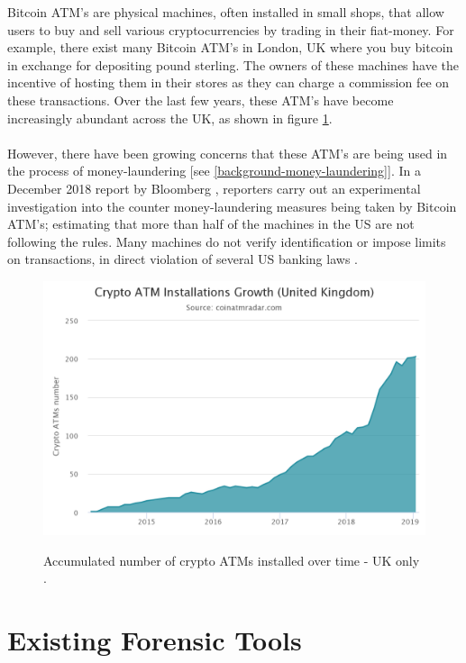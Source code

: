 Bitcoin ATM's are physical machines, often installed in small shops, that allow users to buy and sell various cryptocurrencies by trading in their \gls{fiat-money}. For example, there exist many Bitcoin ATM's in London, UK where you buy bitcoin in exchange for depositing pound sterling. The owners of these machines have the incentive of hosting them in their stores as they can charge a commission fee on these transactions. Over the last few years, these ATM's have become increasingly abundant across the UK, as shown in figure \ref{fig:background-atm-growth}. 
\\\\
However, there have been growing concerns that these ATM's are being used in the process of \gls{money-laundering} [see \ref{background-money-laundering}]. In a December 2018 report by Bloomberg \cite{RefWorks:doc:5c4af4bfe4b0686b56fa4839}, reporters carry out an experimental investigation into the counter money-laundering measures being taken by Bitcoin ATM's; estimating that more than half of the machines in the US are not following the rules. Many machines do not verify identification or impose limits on transactions, in direct violation of several US banking laws \cite{RefWorks:doc:5c4af4bfe4b0686b56fa4839}. 

\begin{figure}[h!]
  \centering
  \includegraphics[width = 15cm]{./figures/atm-installs-uk}\\[0.5cm] 
  \caption{Accumulated number of crypto ATMs installed over time - UK only \cite{RefWorks:doc:5c3f53f3e4b029cf9278c787}.}
  \label{fig:background-atm-growth}
\end{figure}


\section{Existing Forensic Tools}\label{background-existing-tools}

